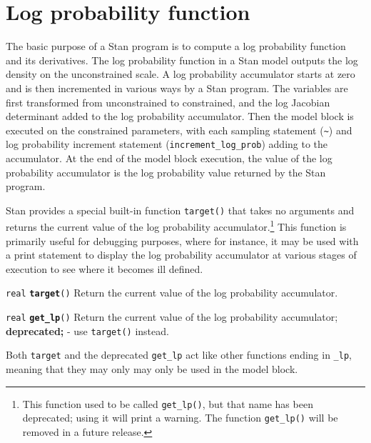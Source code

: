 \documentclass[
  10pt,
]{book}
\begin{document}
\hypertarget{get-log-prob}{%
\section{Log probability function}\label{get-log-prob}}

The basic purpose of a Stan program is to compute a log probability
function and its derivatives. The log probability function in a Stan
model outputs the log density on the unconstrained scale. A log
probability accumulator starts at zero and is then incremented in
various ways by a Stan program. The variables are first transformed
from unconstrained to constrained, and the log Jacobian determinant
added to the log probability accumulator. Then the model block is
executed on the constrained parameters, with each sampling statement
(\texttt{\textasciitilde{}}) and log probability increment statement (\texttt{increment\_log\_prob})
adding to the accumulator. At the end of the model block execution,
the value of the log probability accumulator is the log probability
value returned by the Stan program.

Stan provides a special built-in function \texttt{target()} that takes no
arguments and returns the current value of the log probability
accumulator.\footnote{This function used to be called \texttt{get\_lp()}, but that name
  has been deprecated; using it will print a warning. The function
  \texttt{get\_lp()} will be removed in a future release.} This function is primarily useful for debugging
purposes, where for instance, it may be used with a print statement to
display the log probability accumulator at various stages of execution
to see where it becomes ill defined.


\texttt{real} \textbf{\texttt{target}}\texttt{()}\newline
Return the current value of the log probability accumulator.


\texttt{real} \textbf{\texttt{get\_lp}}\texttt{()}\newline
Return the current value of the log probability accumulator;
\textbf{deprecated;} - use \texttt{target()} instead.

Both \texttt{target} and the deprecated \texttt{get\_lp} act like other functions
ending in \texttt{\_lp}, meaning that they may only may only be used in the
model block.
\end{document}

